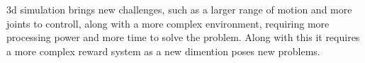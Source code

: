 3d simulation brings new challenges, such as a larger range of motion and more joints to controll, along with a more complex environment, requiring more processing power and more time to solve the problem. 
Along with this it requires a more complex reward system as a new dimention poses new problems.





